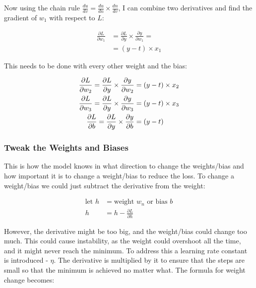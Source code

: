 \documentclass{article}
\begin{document}
Now using the chain rule $\frac{du}{dv} = \frac{du}{dn} \times \frac{dn}{dv}$,
I can combine two derivatives and find the gradient of $w_1$ with respect to $L$:


\begin{equation}
\begin{split}
\frac{\partial L}{\partial w_1} &=
\frac{\partial L}{\partial y} \times \frac{\partial y}{\partial w_1} = \\
&= (y - t) {\times} x_1
\end{split}
\label{eq:dLdw}
\end{equation}


This needs to be done with every other weight and the bias:

\begin{align}
\frac{\partial L}{\partial w_2} =
\frac{\partial L}{\partial y} \times \frac{\partial y}{\partial w_2} &=
(y - t) \times x_2
\notag \\
\frac{\partial L}{\partial w_3} =
\frac{\partial L}{\partial y} \times \frac{\partial y}{\partial w_3} &=
(y - t) \times x_3
\notag \\
\frac{\partial L}{\partial b} =
\frac{\partial L}{\partial y} \times \frac{\partial y}{\partial b} &=
(y - t)
\label{eq:dLdb}
\end{align}


\subsubsection{Tweak the Weights and Biases}


This is how the model knows in what direction to change the weights/bias and how
important it is to change a weight/bias to reduce the loss. To change a
weight/bias we could just subtract the derivative from the weight:

\[
\begin{split}
\text{let } h &= \text{weight $w_n$ or bias $b$} \\
h &= h - \frac{\partial L}{\partial h}
\end{split}
\]

However, the derivative might be too big, and the weight/bias could change too much. This could
cause instability, as the weight could overshoot all the time, and it might never reach the
minimum. To address this a learning rate constant is introduced - $\eta$. The derivative is
multiplied by it to ensure that the steps are small so that the minimum is achieved no matter
what. The formula for weight change becomes:
\end{document}
